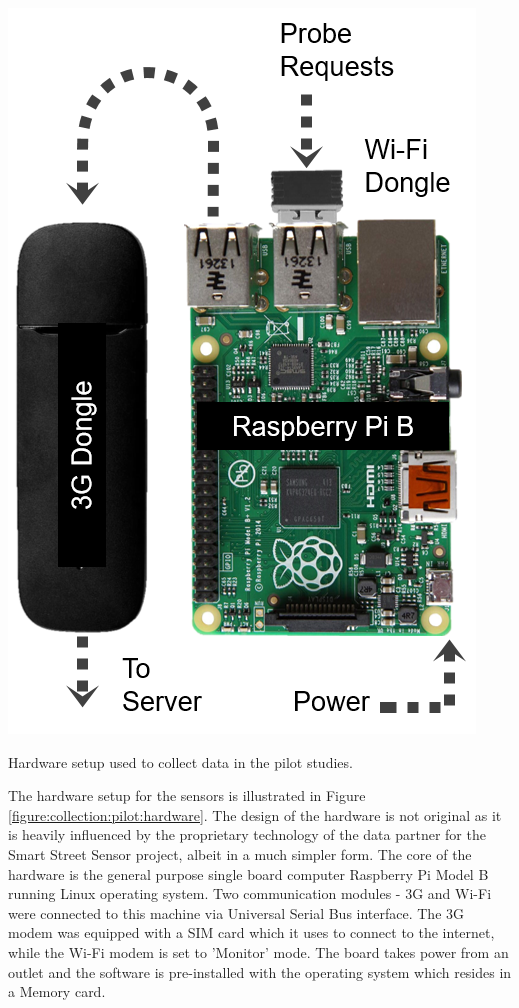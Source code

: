 \begin{marginfigure}[2cm]
  \includegraphics{images/pilot-hardware.png}
  \caption{Hardware setup used to collect data in the pilot studies.}
  \label{figure:collection:pilot:hardware}
\end{marginfigure}

The hardware setup for the sensors is illustrated in Figure \ref{figure:collection:pilot:hardware}.
The design of the hardware is not original as it is heavily influenced by the proprietary technology of the data partner for the Smart Street Sensor project, albeit in a much simpler form. 
The core of the hardware is the general purpose single board computer Raspberry Pi Model B running Linux operating system.
Two communication modules - 3G and Wi-Fi were connected to this machine via Universal Serial Bus interface.
The 3G modem was equipped with a SIM card which it uses to connect to the internet, while the Wi-Fi modem is set to 'Monitor' mode.
The board takes power from an outlet and the software is pre-installed with the operating system which resides in a Memory card.

